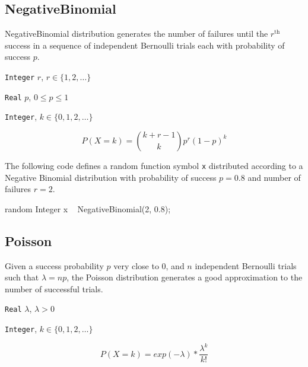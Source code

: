 \subsection{NegativeBinomial}
NegativeBinomial distribution generates the number of failures until the $r^{\text{th}}$ success in a sequence of independent Bernoulli trials each with probability of success $p$.

\begin{itemize*}
\item[] \verb|Integer| $r$, $r \in \{1, 2, \ldots \}$
\item[] \verb|Real| $p$, $0 \leq p \leq 1$
\end{itemize*}

\begin{itemize*}
\item[] \verb|Integer|, $k \in \{0, 1, 2, \ldots \}$
\end{itemize*}

\[
	P(X = k) = \binom{k + r - 1}{k} p^{r} (1-p)^{k}
\]

The following code defines a random function symbol \verb|x| distributed according to a Negative Binomial distribution with probability of success $p = 0.8$ and number of failures $r = 2$.
\begin{blogcode}
random Integer x ~ NegativeBinomial(2, 0.8);
\end{blogcode}


\subsection{Poisson}
Given a success probability $p$ very close to $0$, and $n$ independent Bernoulli trials such that $\lambda = np$, the Poisson distribution generates a good approximation to the number of successful trials.

\begin{itemize*}
\item[] \verb|Real| $\lambda$, $\lambda > 0$
\end{itemize*}

\begin{itemize*}
\item[] \verb|Integer|, $k \in \{0, 1, 2, \ldots \}$
\end{itemize*}

\[
	P(X = k) = exp(-\lambda) * \frac{\lambda^{k}}{k!}
\]

